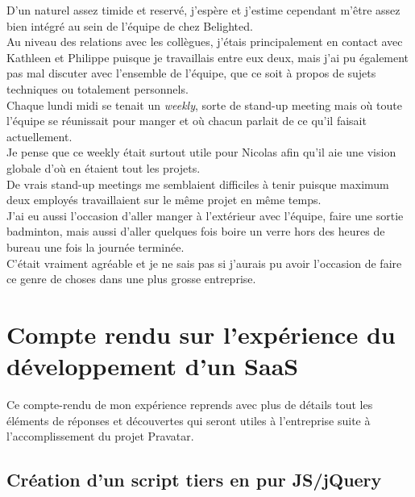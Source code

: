 \documentclass{report}
\begin{document}
    D'un naturel assez timide et reservé, j'espère et j'estime cependant m'être assez bien intégré au sein de l'équipe de chez Belighted.\\

    Au niveau des relations avec les collègues, j'étais principalement en contact avec Kathleen et Philippe puisque je travaillais entre eux deux, mais j'ai pu également pas mal discuter avec
    l'ensemble de l'équipe, que ce soit à propos de sujets techniques ou totalement personnels.\\

    Chaque lundi midi se tenait un \textit{weekly}, sorte de stand-up meeting mais où toute l'équipe se réunissait pour manger et où chacun parlait de ce qu'il faisait actuellement.\\
    Je pense que ce weekly était surtout utile pour Nicolas afin qu'il aie une vision globale d'où en étaient tout les projets.\\
    De vrais stand-up meetings me semblaient difficiles à tenir puisque maximum deux employés travaillaient sur le même projet en même temps.\\

    J'ai eu aussi l'occasion d'aller manger à l'extérieur avec l'équipe, faire une sortie badminton, mais aussi d'aller quelques fois boire un verre hors des heures de bureau une fois la journée terminée.\\
    C'était vraiment agréable et je ne sais pas si j'aurais pu avoir l'occasion de faire ce genre de choses dans une plus grosse entreprise.\\

  \section{Compte rendu sur l'expérience du développement d'un SaaS}
  \label{sec:Compte rendu sur l'expérience du développement d'un SaaS}

    Ce compte-rendu de mon expérience reprends avec plus de détails tout les éléments de réponses et découvertes qui seront utiles à l'entreprise suite à l'accomplissement du projet Pravatar.\\

    \subsection{Création d'un script tiers en pur JS/jQuery}
    \label{sub:Création d'un script tiers en pur JS/jQuery}
\end{document}
